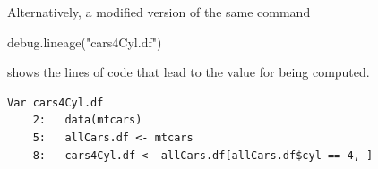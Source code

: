 %

%

Alternatively, a modified version of the same command 
\begin{example}
debug.lineage("cars4Cyl.df")
\end{example}
shows the lines of code that lead to the value for  being computed.
\begin{verbatim}
Var cars4Cyl.df 
	2: 	 data(mtcars) 
	5: 	 allCars.df <- mtcars 
	8: 	 cars4Cyl.df <- allCars.df[allCars.df$cyl == 4, ] 
\end{verbatim}

%

%




